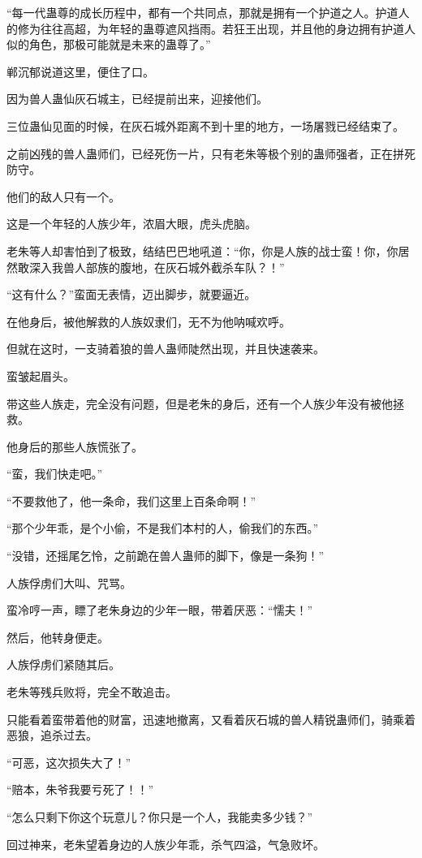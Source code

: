 \begin{this_body}
“每一代蛊尊的成长历程中，都有一个共同点，那就是拥有一个护道之人。护道人的修为往往高超，为年轻的蛊尊遮风挡雨。若狂王出现，并且他的身边拥有护道人似的角色，那极可能就是未来的蛊尊了。”

郸沉郁说道这里，便住了口。

因为兽人蛊仙灰石城主，已经提前出来，迎接他们。

三位蛊仙见面的时候，在灰石城外距离不到十里的地方，一场屠戮已经结束了。

之前凶残的兽人蛊师们，已经死伤一片，只有老朱等极个别的蛊师强者，正在拼死防守。

他们的敌人只有一个。

这是一个年轻的人族少年，浓眉大眼，虎头虎脑。

老朱等人却害怕到了极致，结结巴巴地吼道：“你，你是人族的战士蛮！你，你居然敢深入我兽人部族的腹地，在灰石城外截杀车队？！”

“这有什么？”蛮面无表情，迈出脚步，就要逼近。

在他身后，被他解救的人族奴隶们，无不为他呐喊欢呼。

但就在这时，一支骑着狼的兽人蛊师陡然出现，并且快速袭来。

蛮皱起眉头。

带这些人族走，完全没有问题，但是老朱的身后，还有一个人族少年没有被他拯救。

他身后的那些人族慌张了。

“蛮，我们快走吧。”

“不要救他了，他一条命，我们这里上百条命啊！”

“那个少年乖，是个小偷，不是我们本村的人，偷我们的东西。”

“没错，还摇尾乞怜，之前跪在兽人蛊师的脚下，像是一条狗！”

人族俘虏们大叫、咒骂。

蛮冷哼一声，瞟了老朱身边的少年一眼，带着厌恶：“懦夫！”

然后，他转身便走。

人族俘虏们紧随其后。

老朱等残兵败将，完全不敢追击。

只能看着蛮带着他的财富，迅速地撤离，又看着灰石城的兽人精锐蛊师们，骑乘着恶狼，追杀过去。

“可恶，这次损失大了！”

“赔本，朱爷我要亏死了！！”

“怎么只剩下你这个玩意儿？你只是一个人，我能卖多少钱？”

回过神来，老朱望着身边的人族少年乖，杀气四溢，气急败坏。

\end{this_body}

